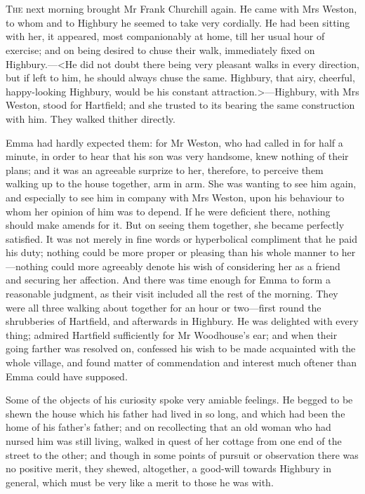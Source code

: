 \chapter[Chapter \thechapter]{}
\lettrine[lraise=0.3]{T}{he} next morning brought Mr Frank Churchill again. He came with Mrs Weston, to whom and to Highbury he seemed to take very cordially. He had been sitting with her, it appeared, most companionably at home, till her usual hour of exercise; and on being desired to chuse their walk, immediately fixed on Highbury.—<He did not doubt there being very pleasant walks in every direction, but if left to him, he should always chuse the same. Highbury, that airy, cheerful, happy-looking Highbury, would be his constant attraction.>—Highbury, with Mrs Weston, stood for Hartfield; and she trusted to its bearing the same construction with him. They walked thither directly.

Emma had hardly expected them: for Mr Weston, who had called in for half a minute, in order to hear that his son was very handsome, knew nothing of their plans; and it was an agreeable surprize to her, therefore, to perceive them walking up to the house together, arm in arm. She was wanting to see him again, and especially to see him in company with Mrs Weston, upon his behaviour to whom her opinion of him was to depend. If he were deficient there, nothing should make amends for it. But on seeing them together, she became perfectly satisfied. It was not merely in fine words or hyperbolical compliment that he paid his duty; nothing could be more proper or pleasing than his whole manner to her—nothing could more agreeably denote his wish of considering her as a friend and securing her affection. And there was time enough for Emma to form a reasonable judgment, as their visit included all the rest of the morning. They were all three walking about together for an hour or two—first round the shrubberies of Hartfield, and afterwards in Highbury. He was delighted with every thing; admired Hartfield sufficiently for Mr Woodhouse's ear; and when their going farther was resolved on, confessed his wish to be made acquainted with the whole village, and found matter of commendation and interest much oftener than Emma could have supposed.

Some of the objects of his curiosity spoke very amiable feelings. He begged to be shewn the house which his father had lived in so long, and which had been the home of his father's father; and on recollecting that an old woman who had nursed him was still living, walked in quest of her cottage from one end of the street to the other; and though in some points of pursuit or observation there was no positive merit, they shewed, altogether, a good-will towards Highbury in general, which must be very like a merit to those he was with.

